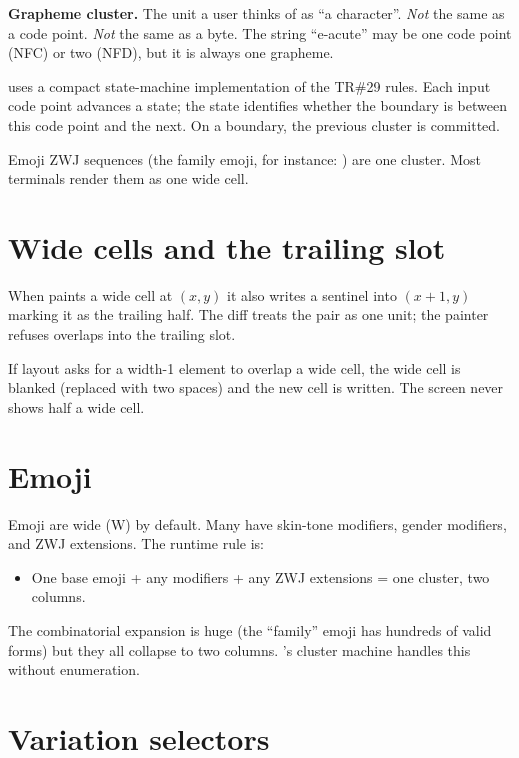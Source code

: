 \begin{idea}
\textbf{Grapheme cluster.} The unit a user thinks of as ``a
character''. \emph{Not} the same as a code point. \emph{Not} the
same as a byte. The string ``e-acute'' may be one code point (NFC) or
two (NFD), but it is always one grapheme.
\end{idea}

\maya{} uses a compact state-machine implementation of the TR\#29
rules. Each input code point advances a state; the state
identifies whether the boundary is between this code point and
the next. On a boundary, the previous cluster is committed.

Emoji ZWJ sequences (the family emoji, for instance:
) are one cluster.
Most terminals render them as one wide cell.

\section{Wide cells and the trailing slot}

When \maya{} paints a wide cell at $(x, y)$ it also writes a
sentinel into $(x+1, y)$ marking it as the trailing half. The
diff treats the pair as one unit; the painter refuses overlaps
into the trailing slot.

If layout asks for a width-1 element to overlap a wide cell, the
wide cell is blanked (replaced with two spaces) and the new cell
is written. The screen never shows half a wide cell.

\section{Emoji}

Emoji are wide (W) by default. Many have skin-tone modifiers,
gender modifiers, and ZWJ extensions. The runtime rule is:

\begin{itemize}[leftmargin=*]
  \item One base emoji + any modifiers + any ZWJ extensions =
    one cluster, two columns.
\end{itemize}

The combinatorial expansion is huge (the ``family'' emoji has
hundreds of valid forms) but they all collapse to two columns.
\maya{}'s cluster machine handles this without enumeration.

\section{Variation selectors}

